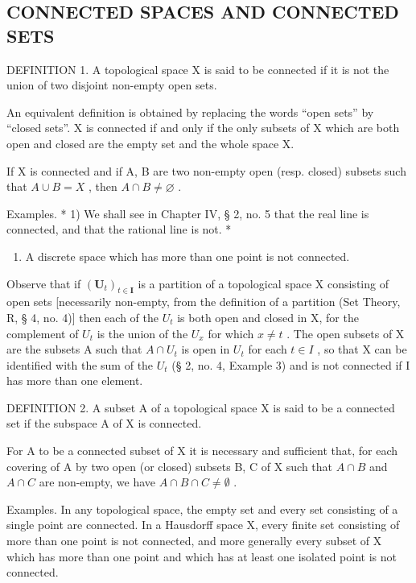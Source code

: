 \subsection{CONNECTED SPACES AND CONNECTED SETS}

DEFINITION 1. A topological space X is said to be connected if it is not the union of two disjoint non-empty open sets.

An equivalent definition is obtained by replacing the words ``open sets'' by ``closed sets''. X is connected if and only if the only subsets of X which are both open and closed are the empty set and the whole space X.

If X is connected and if A, B are two non-empty open (resp. closed) subsets such that \(A \cup B = X\) , then \(A \cap B \neq \varnothing\) .

Examples. * 1) We shall see in Chapter IV, § 2, no. 5 that the real line is connected, and that the rational line is not. *

\begin{enumerate}
\def\labelenumi{\arabic{enumi})}
\setcounter{enumi}{1}
\tightlist
\item
  A discrete space which has more than one point is not connected.
\end{enumerate}

Observe that if \((\mathbf{U}_{t})_{t\in\mathbf{I}}\) is a partition of a topological space X consisting of open sets {[}necessarily non-empty, from the definition of a partition (Set Theory, R, § 4, no. 4){]} then each of the \(U_{t}\) is both open and closed in X, for the complement of \(U_{t}\) is the union of the \(U_{x}\) for which \(x\neq t\) . The open subsets of X are the subsets A such that \(A\cap U_{t}\) is open in \(U_{t}\) for each \(t\in I\) , so that X can be identified with the sum of the \(U_{t}\) (§ 2, no. 4, Example 3) and is not connected if I has more than one element.

DEFINITION 2. A subset A of a topological space X is said to be a connected set if the subspace A of X is connected.

For A to be a connected subset of X it is necessary and sufficient that, for each covering of A by two open (or closed) subsets B, C of X such that \(A \cap B\) and \(A \cap C\) are non-empty, we have \(A \cap B \cap C \neq \emptyset\) .

Examples. In any topological space, the empty set and every set consisting of a single point are connected. In a Hausdorff space X, every finite set consisting of more than one point is not connected, and more generally every subset of X which has more than one point and which has at least one isolated point is not connected.

